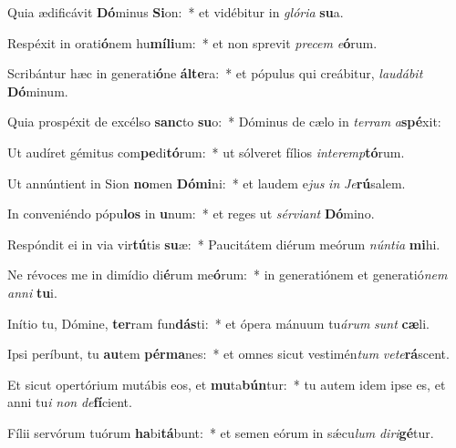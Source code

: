 \item Quia ædificávit \textbf{Dó}minus \textbf{Si}on:~* et vidébitur in \textit{gló}\textit{ri}\textit{a} \textbf{su}a.
\item Respéxit in orati\textbf{ó}nem hu\textbf{mí}\textbf{li}um:~* et non sprevit \textit{pre}\textit{cem} \textit{e}\textbf{ó}rum.
\item Scribántur hæc in generati\textbf{ó}ne \textbf{ál}\textbf{te}ra:~* et pópulus qui creábitur, \textit{lau}\textit{dá}\textit{bit} \textbf{Dó}minum.
\item Quia prospéxit de excélso \textbf{sanc}to \textbf{su}o:~* Dóminus de cælo in \textit{ter}\textit{ram} \textit{a}\textbf{spé}xit:
\item Ut audíret gémitus com\textbf{pe}di\textbf{tó}rum:~* ut sólveret fílios \textit{in}\textit{ter}\textit{emp}\textbf{tó}rum.
\item Ut annúntient in Sion \textbf{no}men \textbf{Dó}\textbf{mi}ni:~* et laudem e\textit{jus} \textit{in} \textit{Je}\textbf{rú}salem.
\item In conveniéndo pópu\textbf{los} in \textbf{u}num:~* et reges ut \textit{sér}\textit{vi}\textit{ant} \textbf{Dó}mino.
\item Respóndit ei in via vir\textbf{tú}tis \textbf{su}æ:~* Paucitátem diérum meórum \textit{nún}\textit{ti}\textit{a} \textbf{mi}hi.
\item Ne révoces me in dimídio di\textbf{é}rum me\textbf{ó}rum:~* in generatiónem et generatió\textit{nem} \textit{an}\textit{ni} \textbf{tu}i.
\item Inítio tu, Dómine, \textbf{ter}ram fun\textbf{dás}ti:~* et ópera mánuum tu\textit{á}\textit{rum} \textit{sunt} \textbf{cæ}li.
\item Ipsi períbunt, tu \textbf{au}tem \textbf{pér}\textbf{ma}nes:~* et omnes sicut vestimén\textit{tum} \textit{ve}\textit{te}\textbf{rá}scent.
\item Et sicut opertórium mutábis eos, et \textbf{mu}ta\textbf{bún}tur:~* tu autem idem ipse es, et anni tu\textit{i} \textit{non} \textit{de}\textbf{fí}cient.
\item Fílii servórum tuórum \textbf{ha}bi\textbf{tá}bunt:~* et semen eórum in sǽcu\textit{lum} \textit{di}\textit{ri}\textbf{gé}tur.
